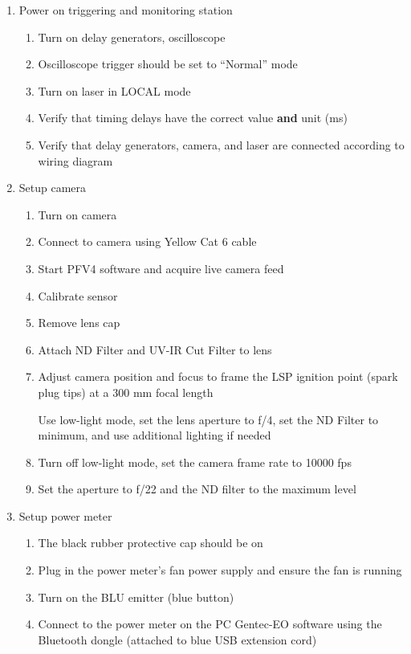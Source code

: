 \begin{enumerate}
\def\labelenumi{\arabic{enumi}.}

\item
  Power on triggering and monitoring station

  \begin{enumerate}
  \def\labelenumii{\arabic{enumii}.}
  
  \item
    Turn on delay generators, oscilloscope
  \item
    Oscilloscope trigger should be set to ``Normal'' mode
  \item
    Turn on laser in LOCAL mode
  \item
    Verify that timing delays have the correct value \textbf{and} unit
    (ms)
  \item
    Verify that delay generators, camera, and laser are connected
    according to wiring diagram
  \end{enumerate}
\item
  Setup camera

  \begin{enumerate}
  \def\labelenumii{\arabic{enumii}.}
  \item
    Turn on camera
  \item
    Connect to camera using Yellow Cat 6 cable
  \item
    Start PFV4 software and acquire live camera feed
  \item
    Calibrate sensor
  \item
    Remove lens cap
  \item
    Attach ND Filter and UV-IR Cut Filter to lens
  \item
    Adjust camera position and focus to frame the LSP ignition point
    (spark plug tips) at a 300 mm focal length

    {\color{cyan} Use low-light mode, set the lens aperture to f/4, set the ND
    Filter to minimum, and use additional lighting if needed}
  \item
    Turn off low-light mode, set the camera frame rate to 10000 fps
  \item
    Set the aperture to f/22 and the ND filter to the maximum level
  \end{enumerate}
\item
  Setup power meter

  \begin{enumerate}
  \def\labelenumii{\arabic{enumii}.}
  \item
    The black rubber protective cap should be on
  \item
    Plug in the power meter's fan power supply and ensure the fan is
    running
  \item
    Turn on the BLU emitter (blue button)
  \item
    Connect to the power meter on the PC Gentec-EO software using the
    Bluetooth dongle (attached to blue USB extension cord)


\end{enumerate}
\end{enumerate}
